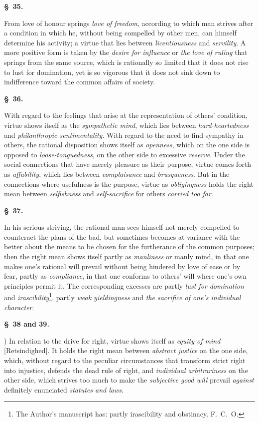 \documentclass[12pt]{article}
\newcommand{\opage}[1]{\marginnote{\footnotesize\textit{[#1]}}}
\newcommand{\slaw}[1]{\par\medskip\begin{center}\textbf{\S~#1.}\end{center}\nopagebreak}
\begin{document}
\slaw{35}
From love of honour springs \emph{love of freedom}, according to which man strives after a condition in which he, without being compelled by other men, can himself determine his activity; a virtue that lies between \emph{licentiousness} and \emph{servility}. A more positive form is taken by the \emph{desire for influence} or \emph{the love of ruling} that springs from the same source, which is rationally so limited that it does not rise to lust for domination, yet is so vigorous that it does not sink down to indifference toward the common affairs of society.

\slaw{36}
With regard to the feelings that arise at the representation of others' condition, virtue shows itself as the \emph{sympathetic mind}, which lies between \emph{hard-heartedness} and \emph{philanthropic sentimentality}. With regard to the need to find sympathy in others, the rational disposition shows itself as \emph{openness}, which on the one side is opposed to \emph{loose-tonguedness}, on the other side to excessive \emph{reserve}. Under the \opage{158}social connections that have merely pleasure as their purpose, virtue comes forth as \emph{affability}, which lies between \emph{complaisance} and \emph{brusqueness}. But in the connections where usefulness is the purpose, virtue as \emph{obligingness} holds the right mean between \emph{selfishness} and \emph{self-sacrifice} for others \emph{carried too far}.

\slaw{37}
In his serious striving, the rational man sees himself not merely compelled to counteract the plans of the bad, but sometimes becomes at variance with the better about the means to be chosen for the furtherance of the common purposes; then the right mean shows itself partly as \emph{manliness} or manly mind, in that one makes one's rational will prevail without being hindered by love of ease or by fear, partly as \emph{compliance}, in that one conforms to others' will where one's own principles permit it. The corresponding excesses are partly \emph{lust for domination} and \emph{irascibility}\footnote{The Author's manuscript has: partly irascibility and obstinacy. F.\ C.\ O.}, partly \emph{weak yieldingness} and \emph{the sacrifice of one's individual character}.

\slaw{38 and 39}
1) In relation to the drive for right, virtue shows itself as \emph{equity of mind} [Retsindighed]. It holds the right mean between \emph{abstract justice} on the one side, which, without regard to the peculiar circumstances that transform strict right into injustice, defends the dead rule of right, and \emph{individual arbitrariness} on the other side, which strives too much to make the \emph{subjective good will} prevail \emph{against} definitely enunciated \emph{statutes and laws}.
\end{document}
